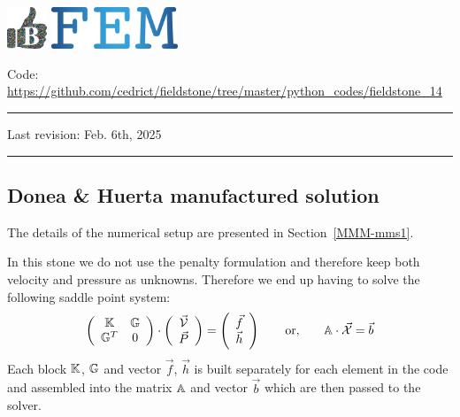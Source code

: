 \includegraphics[height=1.25cm]{images/pictograms/benchmark}
\includegraphics[height=1.25cm]{images/pictograms/FEM}


%

\begin{center}
\inpython
{\small Code: \url{https://github.com/cedrict/fieldstone/tree/master/python_codes/fieldstone_14}}
\end{center}

\par\noindent\rule{\textwidth}{0.4pt}

Last revision: Feb. 6th, 2025

\par\noindent\rule{\textwidth}{0.4pt}

\subsection*{Donea \& Huerta manufactured solution}

The details of the numerical setup are presented in Section~\ref{MMM-mms1}.

In this stone we do not use the penalty formulation and therefore 
keep both velocity and pressure as unknowns. Therefore we end up having to solve 
the following saddle point system:
\[
\left(
\begin{array}{cc}
{\mathbb{K}} & {\mathbb{G}} \\ {\mathbb{G}}^T & 0 
\end{array}
\right)
\cdot
\left(
\begin{array}{c}
\vec{\cal V} \\ \vec{P}
\end{array}
\right)
=
\left(
\begin{array}{c}
\vec{f} \\ \vec{h}
\end{array}
\right)
\quad\quad
{\rm or,}
\quad\quad
{\mathbb{A}} \cdot \vec{\cal X} =\vec{b}
\]
Each block ${\mathbb{K}}$, ${\mathbb{G}}$ and vector $\vec{f}$, $\vec{h}$ is built separately for each element 
in the code and assembled into 
the matrix ${\mathbb{A}}$ and vector $\vec{b}$ which are then passed to the solver. 


